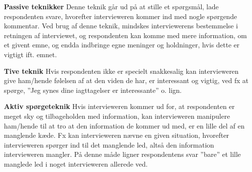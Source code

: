 \textbf{Passive teknikker}\newline
Denne teknik går ud på at stille et spørgsmål, lade respondenten svare, hvorefter intervieweren kommer ind med nogle spørgende kommentar. Ved brug af denne teknik, mindskes interviewerens bestemmelse i retningen af interviewet, og respondenten kan komme med mere information, om et givent emne, og endda indbringe egne meninger og holdninger, hvis dette er vigtigt ift. emnet.\newline

\textbf{Tive teknik}\newline
Hvis respondenten ikke er specielt snakkesalig kan intervieweren give ham/hende følelsen af at den viden de har, er interessant og vigtig, ved fx at spørge, ”Jeg synes dine iagttagelser er interessante” o. lign.\newline

\textbf{Aktiv spørgeteknik}\newline
Hvis intervieweren kommer ud for, at respondenten er meget sky og tilbageholden med information, kan intervieweren manipulere ham/hende til at tro at den information de kommer ud med, er en lille del af en manglende kæde. Fx kan intervieweren nævne en given situation, hvorefter intervieweren spørger ind til det manglende led, altså den information intervieweren mangler. På denne måde ligner respondentens svar ”bare” et lille manglede led i noget intervieweren allerede ved.\newline
